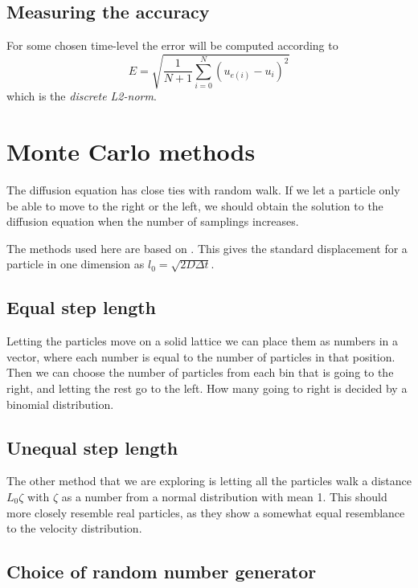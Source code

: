 \documentclass[11pt,a4paper,final]{article}
\numberwithin{equation}{section}
\begin{document}
\subsection{Measuring the accuracy}

For some chosen time-level the error will be computed according to 
\begin{equation}
E = \sqrt{\frac{1}{N+1} \sum_{i=0}^{N} (u_{e(i)}-u_{i})^2}
\label{eq:EL2}
\end{equation}
which is the \emph{discrete L2-norm}. 

\section{Monte Carlo methods}

The diffusion equation has close ties with random walk. If we let a 
particle only be able to move to the right or the left, we should obtain
the solution to the diffusion equation when the number of samplings 
increases.

The methods used here are based on \cite{farnell2005monte}. This gives 
the standard displacement for a particle in one dimension 
as $l_0 = \sqrt{2D\Delta t}$.

\subsection{Equal step length}
Letting the particles move on a solid lattice we can place them as 
numbers in a vector, where each number is equal to the number of 
particles in that position. Then we can choose the number of particles
from  each bin that is going to the right, and letting the rest go
to the left. 
How many going to right is decided by a binomial distribution.

\subsection{Unequal step length}
The other method that we are exploring is letting all the particles 
walk a distance $L_0\zeta$ with $\zeta$ as a number from a normal 
distribution with mean 1. This should more closely resemble real
particles, as they show a somewhat equal resemblance to the velocity 
distribution.


\subsection{Choice of random number generator}
\end{document}
